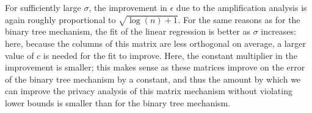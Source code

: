 For sufficiently large $\sigma$, the improvement in $\epsilon$ due to the amplification analysis is again roughly proportional to $\sqrt{\log (n) + 1}$. For the same reasons as for the binary tree mechanism, the fit of the linear regression is better as $\sigma$ increases: here, because the columns of this matrix are less orthogonal on average, a larger value of $c$ is needed for the fit to improve. Here, the constant multiplier in the improvement is smaller; this makes sense as these matrices improve on the error of the binary tree mechanism by a constant, and thus the amount by which we can improve the privacy analysis of this matrix mechanism without violating lower bounds is smaller than for the binary tree mechanism. 




